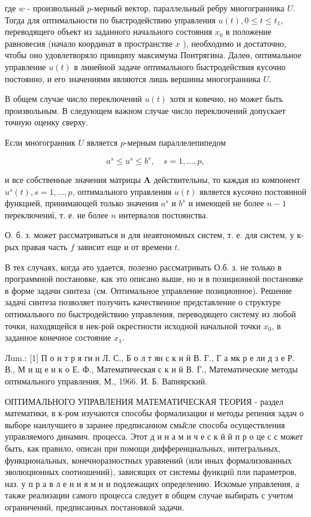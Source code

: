 \documentclass[10pt]{article}
\begin{document}
где $w$ - произвольный $p$-мерный вектор, параллельный ребру многогранника $U$. Тогда для оптимальности по быстродействию управления $u(t), 0 \leqslant t \leqslant t_{1}$, переводящего объект из заданного начального состояния $x_{0}$ в положение равновесия (начало координат в пространстве $x$ ), необходимо и достаточно, чтобы оно удовлетворяло принципу максимума Понтрягина. Далеө, оптимальное управление $u(t)$ в линейной задаче оптимального быстродействия кусочно постоянно, и его значениями являются лишь вершины многогранника $U$.

В общем случае число переключений $u(t)$ хотя и ковечно, но может быть произвольным. В следующем важном случае число переключений допускает точную оценку сверху.

Если многогранник $U$ является $p$-мерным параллелепипедом

\[
a^{s} \leqslant u^{s} \leqslant b^{s}, \quad s=1, \ldots, p,
\]

и все собственные значения матрицы $\boldsymbol{A}$ действительны, то каждая из компонент $u^{s}(t), s=1, \ldots, p$, оптимального управления $u(t)$ является кусочно постоянной функцией, принимающей только значения $a^{s}$ и $b^{s}$ и имеющей не более $n-1$ переключениї, т. е. не более $n$ интервалов постоянства.

О. б. з. может рассматриваться и для неавтономных систем, т. е. для систем, у к-рых правая часть $f$ зависит еще и от времени $t$.

В тех случаях, когда әто удается, полезно рассматривать О.б. з. не только в программной постановке, как это описано выше, но и в позиционной постановке в форме задачи синтеза (см. Оптимальное управление позиционное). Решение задачі синтеза позволяет получить качественное представление о структуре оптимальвого по быстродействию управления, переводящего систему из любой точки, находящейся в нек-рой окрестности исходной начальной точки $x_{0}$, в заданное конечное состояние $x_{1}$.

Лum.: [1] П о н т р я ги н Л. С., Б о л т ян с к и й В. Г., Г а мк р е ли д з е Р. В., М и щ е н к о Е. Ф., Математическая с к и й В. Г., Математические методы оптимального управления, М., 1966.
И. Б. Вапнярский.

ОПТИМАЛЬНОГО УПРАВЛЕНИЯ МАТЕМАТИЧЕСКАЯ ТЕОРИЯ - раздел математики, в к-ром изучаются способы формализации и методы репения задач о выборе наилучшего в заранее предписанном смы̆сле способа осуществления управляемого динамич. процесса. Этот д и н а м и ч е с к й й п р о це с с может быть, как правило, описан при помощи дифференциальных, интегральных, функциональных, конечноразностных уравнений (или иных формализованных эволюционных соотношений), зависящих от системы функциїі пли параметров, наз. у п р а в л е н и я м и и подлежащих определению. Искомые управления, а также реализации самого процесса следует в общем случае выбирать с учетом ограничений, предписанных постановкой задачи.
\end{document}
